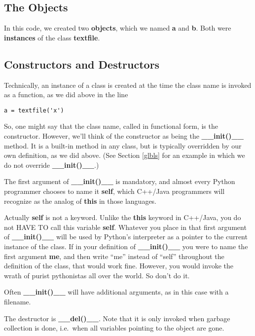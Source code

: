 \subsection{The Objects}

In this code, we created two {\bf objects}, which we named {\bf a} and
{\bf b}.  Both were {\bf instances} of the class {\bf textfile}.

\subsection{Constructors and Destructors}

Technically, an instance of a class is created at the time the class
name is invoked as a function, as we did above in the line

\begin{Verbatim}[fontsize=\relsize{-2}]
a = textfile('x')
\end{Verbatim}

So, one might say that the class name, called in functional form, is the
constructor.  However, we'll think of the constructor as being the
{\bf \_\_init()\_\_} method.  It is a built-in method in any class, but
is typically overridden by our own definition, as we did above.  (See
Section \ref{glbls} for an example in which we do not override {\bf
\_\_init()\_\_}.)

The first argument of {\bf \_\_init()\_\_} is mandatory, and almost
every Python programmer chooses to name it {\bf self}, which C++/Java
programmers will recognize as the analog of {\bf this} in those
languages.

Actually {\bf self} is not a keyword.  Unlike the {\bf this} keyword in
C++/Java, you do not HAVE TO call this variable {\bf self}.  Whatever
you place in that first argument of {\bf \_\_init()\_\_} will be used by
Python's interpreter as a pointer to the current instance of the class.
If in your definition of {\bf \_\_init()\_\_} you were to name the first
argument {\bf me}, and then write ``me'' instead of ``self'' throughout
the definition of the class, that would work fine.  However, you would
invoke the wrath of purist pythonistas all over the world.  So don't do
it.

Often {\bf \_\_init()\_\_} will have additional arguments, as in this
case with a filename.

The destructor is {\bf \_\_del()\_\_}.  Note that it is only invoked
when garbage collection is done, i.e.\ when all variables pointing to the
object are gone.

